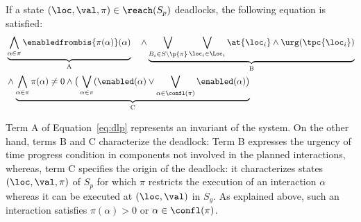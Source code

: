   \begin{theorem}\label{thm:dlp}
    If a state $(\loc,\val,\pi)\in\reach(S_p)$ deadlocks, the following equation is satisfied:
  \begin{equation}\label{eq:dlp}
  \begin{split}
    &\underbrace{\bigwedge_{\alpha\in\pi}\enabledfrombis{\pi(\alpha)}(\alpha)}_\text{A}\quad\wedge
    \underbrace{\bigvee_{B_i\in S\setminus\p{\pi}}\bigvee_{\loc_i\in\Loc_i} \at{\loc_i} \wedge \urg(\tpc{\loc_i})}_\text{B}\\
    &\wedge\underbrace{\bigwedge_{\alpha\in\pi}\pi(\alpha)\neq 0\wedge\big(\bigvee_{\alpha\in\pi}(\enabled(\alpha)\vee
    \bigvee_{\alpha\in\confl(\pi)}\enabled(\alpha)\big)}_\text{C}
  \end{split}
  \end{equation}
  \end{theorem}
  Term A of Equation~\ref{eq:dlp} represents an invariant of the system. On the other hand, terms B and
  C characterize the deadlock: Term B expresses the urgency of time progress condition in components not involved in the planned interactions, 
  whereas, term C specifies the origin of the deadlock: it characterizes states $(\loc,\val,\pi)$ of $S_p$ for which $\pi$ restricts the execution of an 
  interaction $\alpha$ whereas it can be executed at $(\loc,\val)$ in $S_g$.
  As explained above, such an interaction satisfies $\pi(\alpha) > 0$ or $\alpha \in \confl(\pi)$.
  
